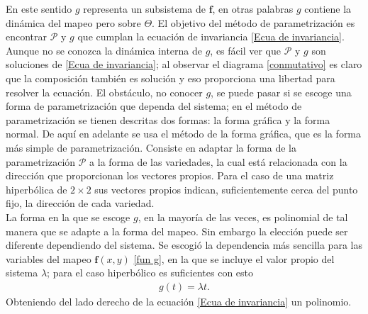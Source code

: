 En este sentido $g$ representa un subsistema de $\mathbf{f}$, en otras palabras $g$ contiene la dinámica del mapeo pero sobre $\Theta$. El objetivo del método de parametrización es encontrar $\mathcal{P}$ y $g$ que cumplan la ecuación de invariancia \eqref{Ecua de invariancia}. Aunque no se conozca la dinámica interna de $g$, es fácil ver que $\mathcal{P}$ y $g$ son soluciones de \eqref{Ecua de invariancia}; al observar el diagrama \eqref{conmutativo} es claro que la composición también es solución y eso proporciona una libertad para resolver la ecuación. El obstáculo, no conocer $g$, se puede pasar si se escoge una forma de parametrización que dependa del sistema; en el método de parametrización se tienen descritas dos formas: la forma gráfica y la forma normal. De aquí en adelante se usa el método de la forma gráfica, que es la forma más simple de parametrización. Consiste en adaptar la forma de la parametrización $\mathcal{P}$ a la forma de las variedades, la cual está relacionada con la dirección que proporcionan los vectores propios. Para el caso de una matriz hiperbólica de $2\times 2$ sus vectores propios indican, suficientemente cerca del punto fijo, la dirección de cada variedad. \\


La forma en la que se escoge $g$, en la mayoría de las veces, es polinomial de tal manera que se adapte a la forma del mapeo. Sin embargo la elección puede ser diferente dependiendo del sistema. Se escogió la dependencia más sencilla para las variables del mapeo $\mathbf{f}(x,y)$ \eqref{fun g}, en la que se incluye el valor propio del sistema $\lambda$; para el caso hiperbólico es suficientes con esto
\begin{eqnarray}
g(t) = \lambda t.
\label{fun g}
\end{eqnarray}
Obteniendo del lado derecho de la ecuación \eqref{Ecua de invariancia} un polinomio. \\

